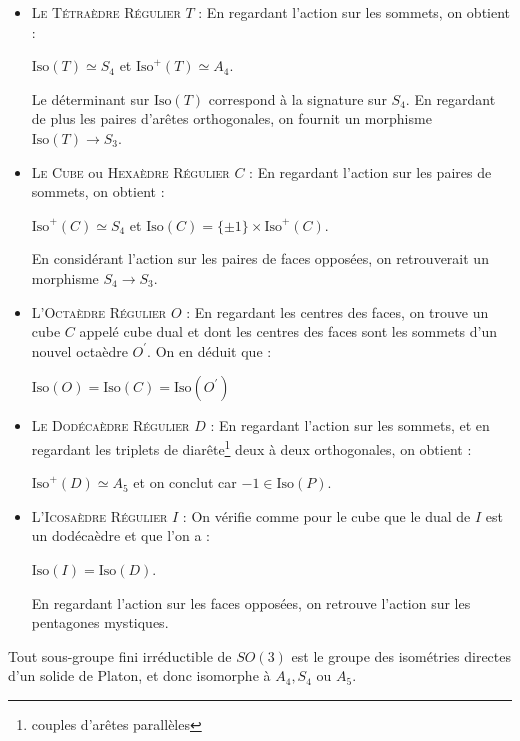 \documentclass{cours}
\begin{document}
\begin{itemize}
    \item \textsc{Le Tétraèdre Régulier} $T$ : En regardant l'action sur les sommets, on obtient : 
    \begin{proposition}
        $\text{Iso}(T) \simeq S_{4}$ et $\text{Iso}^{+}(T) \simeq A_{4}$.
    \end{proposition} Le déterminant sur $\text{Iso}(T)$ correspond à la signature sur $S_{4}$. En regardant de plus les paires d'arêtes orthogonales, on fournit un morphisme $\text{Iso}(T) \rightarrow S_{3}$.
    \item \textsc{Le Cube} ou \textsc{Hexaèdre Régulier} $C$ : En regardant l'action sur les paires de sommets, on obtient : 
    \begin{proposition}
        $\text{Iso}^{+}(C) \simeq S_{4}$ et $\text{Iso}(C) = \{\pm 1\} \times \text{Iso}^{+}(C)$.
    \end{proposition}
    En considérant l'action sur les paires de faces opposées, on retrouverait un morphisme $S_{4} \rightarrow S_{3}$.
    \item \textsc{L'Octaèdre Régulier} $O$ : En regardant les centres des faces, on trouve un cube $C$ appelé cube dual et dont les centres des faces sont les sommets d'un nouvel octaèdre $O^{'}$. On en déduit que : 
    \begin{proposition}
        $\text{Iso}(O) = \text{Iso}(C) = \text{Iso}(O^{'})$
    \end{proposition}
    \item \textsc{Le Dodécaèdre Régulier} $D$ : En regardant l'action sur les sommets, et en regardant les triplets de diarête\footnote{couples d'arêtes parallèles} deux à deux orthogonales, on obtient :
    \begin{proposition}
         $\text{Iso}^{+}(D) \simeq A_{5}$ et on conclut car $-1 \in \text{Iso}(P)$.
    \end{proposition}
    \item \textsc{L'Icosaèdre Régulier} $I$ : On vérifie comme pour le cube que le dual de $I$ est un dodécaèdre et que l'on a :
    \begin{proposition}
        $\text{Iso}(I) = \text{Iso}(D)$.
    \end{proposition}
    En regardant l'action sur les faces opposées, on retrouve l'action sur les pentagones mystiques.
\end{itemize}

\begin{theorem}[Klein]
    Tout sous-groupe fini irréductible de $SO(3)$ est le groupe des isométries directes d'un solide de Platon, et donc isomorphe à $A_{4}, S_{4}$ ou $A_{5}$.
\end{theorem}
\end{document}
